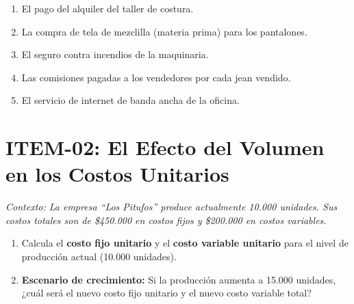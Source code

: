 \documentclass[12pt,a4paper]{article}
\newcommand{\answerspace}{\vspace{4.5cm}}
\newcommand{\lastanswerspace}{\vspace{2cm}}
\begin{document}
\begin{enumerate}[label=\textbf{\arabic*.}, leftmargin=*, itemsep=0pt]

\item El pago del alquiler del taller de costura.
\answerspace

\item La compra de tela de mezclilla (materia prima) para los pantalones.
\answerspace

\item El seguro contra incendios de la maquinaria.
\answerspace

\item Las comisiones pagadas a los vendedores por cada jean vendido.
\answerspace

\item El servicio de internet de banda ancha de la oficina.
\lastanswerspace

\end{enumerate}

\newpage

\section{ITEM-02: El Efecto del Volumen en los Costos Unitarios}

\noindent\textit{Contexto: La empresa ``Los Pitufos'' produce actualmente 10.000 unidades. Sus costos totales son de \$450.000 en costos fijos y \$200.000 en costos variables.}

\vspace{0.5em}

\begin{enumerate}[label=\textbf{\arabic*.}, leftmargin=*, itemsep=0pt]

\item Calcula el \textbf{costo fijo unitario} y el \textbf{costo variable unitario} para el nivel de producción actual (10.000 unidades).
\answerspace

\item \textbf{Escenario de crecimiento:} Si la producción aumenta a 15.000 unidades, ¿cuál será el nuevo costo fijo unitario y el nuevo costo variable total?
\lastanswerspace

\end{enumerate}

\newpage
\end{document}
